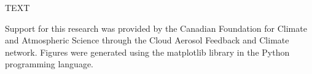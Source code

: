 \documentclass[acp]{copernicus}
\begin{document}
\conclusions
TEXT









\begin{acknowledgements}
Support for this research was provided by the Canadian Foundation for Climate 
and Atmospheric Science through the Cloud Aerosol Feedback and Climate 
network.  Figures were generated using the matplotlib library in the Python
programming language.
\end{acknowledgements}















\end{document}
